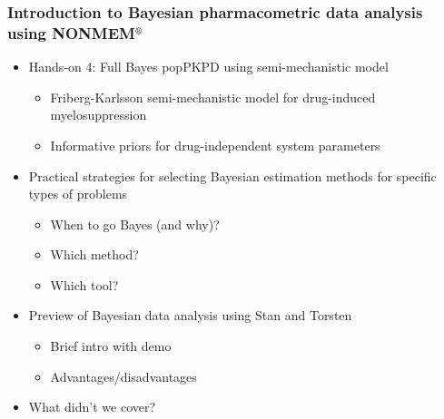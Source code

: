 \documentclass{beamer}
\begin{document}
\begin{frame}
  \frametitle{Introduction to Bayesian pharmacometric data analysis
    using NONMEM$^\text{\textregistered}$}
  
  \begin{itemize}
  \item Hands-on 4: Full Bayes popPKPD using semi-mechanistic model
    \begin{itemize}
    \item Friberg-Karlsson semi-mechanistic model for drug-induced
      myelosuppression
    \item Informative priors for drug-independent system parameters
    \end{itemize}
  \end{itemize}
  \begin{itemize}
  \item Practical strategies for selecting Bayesian estimation methods
    for specific types of problems
    \begin{itemize}
    \item When to go Bayes (and why)?
    \item Which method?
    \item Which tool?
    \end{itemize}
  \item Preview of Bayesian data analysis using Stan and Torsten
    \begin{itemize}
    \item Brief intro with demo
    \item Advantages/disadvantages
    \end{itemize}
  \item What didn't we cover?
  \end{itemize}

\end{frame}

\end{document}
